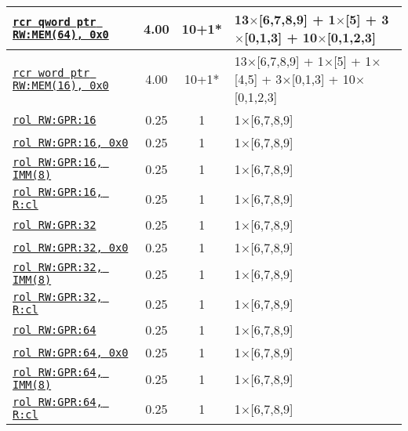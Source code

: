 \documentclass[a4paper,english,fontsize=9]{scrartcl}
\begin{document}
\begin{longtable}{p{}ccL{.25\textwidth}}
  \midrule
  \texttt{\href{https://felixcloutier.com/x86/RCL:RCR:ROL:ROR.html}{rcr qword ptr RW:MEM(64), 0x0}} & 4.00 & 10+1* & 13\(\times\)[6,7,8,9] + 1\(\times\)[5] + 3\(\times\)[0,1,3] + 10\(\times\)[0,1,2,3] \\
  \midrule
  \texttt{\href{https://felixcloutier.com/x86/RCL:RCR:ROL:ROR.html}{rcr word ptr RW:MEM(16), 0x0}} & 4.00 & 10+1* & 13\(\times\)[6,7,8,9] + 1\(\times\)[5] + 1\(\times\)[4,5] + 3\(\times\)[0,1,3] + 10\(\times\)[0,1,2,3] \\
  \midrule
  \texttt{\href{https://felixcloutier.com/x86/RCL:RCR:ROL:ROR.html}{rol RW:GPR:16}} & 0.25 & 1 & 1\(\times\)[6,7,8,9] \\
  \midrule
  \texttt{\href{https://felixcloutier.com/x86/RCL:RCR:ROL:ROR.html}{rol RW:GPR:16, 0x0}} & 0.25 & 1 & 1\(\times\)[6,7,8,9] \\
  \midrule
  \texttt{\href{https://felixcloutier.com/x86/RCL:RCR:ROL:ROR.html}{rol RW:GPR:16, IMM(8)}} & 0.25 & 1 & 1\(\times\)[6,7,8,9] \\
  \midrule
  \texttt{\href{https://felixcloutier.com/x86/RCL:RCR:ROL:ROR.html}{rol RW:GPR:16, R:cl}} & 0.25 & 1 & 1\(\times\)[6,7,8,9] \\
  \midrule
  \texttt{\href{https://felixcloutier.com/x86/RCL:RCR:ROL:ROR.html}{rol RW:GPR:32}} & 0.25 & 1 & 1\(\times\)[6,7,8,9] \\
  \midrule
  \texttt{\href{https://felixcloutier.com/x86/RCL:RCR:ROL:ROR.html}{rol RW:GPR:32, 0x0}} & 0.25 & 1 & 1\(\times\)[6,7,8,9] \\
  \midrule
  \texttt{\href{https://felixcloutier.com/x86/RCL:RCR:ROL:ROR.html}{rol RW:GPR:32, IMM(8)}} & 0.25 & 1 & 1\(\times\)[6,7,8,9] \\
  \midrule
  \texttt{\href{https://felixcloutier.com/x86/RCL:RCR:ROL:ROR.html}{rol RW:GPR:32, R:cl}} & 0.25 & 1 & 1\(\times\)[6,7,8,9] \\
  \midrule
  \texttt{\href{https://felixcloutier.com/x86/RCL:RCR:ROL:ROR.html}{rol RW:GPR:64}} & 0.25 & 1 & 1\(\times\)[6,7,8,9] \\
  \midrule
  \texttt{\href{https://felixcloutier.com/x86/RCL:RCR:ROL:ROR.html}{rol RW:GPR:64, 0x0}} & 0.25 & 1 & 1\(\times\)[6,7,8,9] \\
  \midrule
  \texttt{\href{https://felixcloutier.com/x86/RCL:RCR:ROL:ROR.html}{rol RW:GPR:64, IMM(8)}} & 0.25 & 1 & 1\(\times\)[6,7,8,9] \\
  \midrule
  \texttt{\href{https://felixcloutier.com/x86/RCL:RCR:ROL:ROR.html}{rol RW:GPR:64, R:cl}} & 0.25 & 1 & 1\(\times\)[6,7,8,9] \\

\end{longtable}
\end{document}
